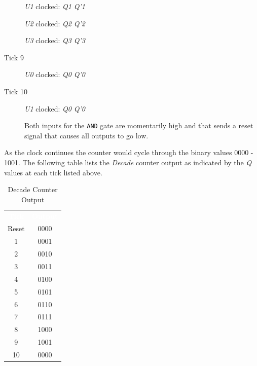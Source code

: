 \begin{description}
	\hspace{14pt}\textit{U1} clocked: \textit{Q1} \textdownarrow \: \textemdash \: \textit{Q'1} \textuparrow
	
	\hspace{14pt}\textit{U2} clocked: \textit{Q2} \textdownarrow \: \textemdash \: \textit{Q'2} \textuparrow
	
	\hspace{14pt}\textit{U3} clocked: \textit{Q3} \textuparrow \: \textemdash \: \textit{Q'3} \textdownarrow

	\item [Tick 9] \textit{U0} clocked: \textit{Q0} \textuparrow \: \textemdash \: \textit{Q'0} \textdownarrow

	\item [Tick 10] \textit{U1} clocked: \textit{Q0} \textuparrow \: \textemdash \: \textit{Q'0} \textdownarrow
	
	\noindent Both inputs for the \texttt{AND} gate are momentarily high and that sends a reset signal that causes all outputs to go low.
	
\end{description}

As the clock continues the counter would cycle through the binary values 0000 - 1001. The following table lists the \textit{Decade} counter output as indicated by the \textit{Q} values at each tick listed above.

\begin{table}[H]
	\sffamily
	\newcommand{\head}[1]{\textcolor{white}{\textbf{#1}}}		
	\begin{center}
		\begin{tabular}{cc} 
			\rowcolor{black!75}
			\head{Tick} & \head{Output} \\
			Reset & 0000 \\
			1 & 0001 \\
			2 & 0010 \\
			3 & 0011 \\
			4 & 0100 \\
			5 & 0101 \\
			6 & 0110 \\
			7 & 0111 \\
			8 & 1000 \\
			9 & 1001 \\
		 10 & 0000
		\end{tabular}
	\end{center}
	\caption{Decade Counter Output}
	\label{tab0603}
\end{table}

